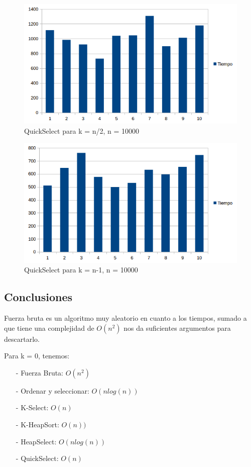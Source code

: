 \begin{figure}[H]
\centering
\includegraphics[width=\textwidth]{KN2/QuickSelectN2.png}
\caption{QuickSelect para k = n/2, n = 10000}
\end{figure}

\begin{figure}[H]
\centering
\includegraphics[width=\textwidth]{KN/QuickSelectN.png}
\caption{QuickSelect para k = n-1, n = 10000}
\end{figure}
\newpage

\subsection{Conclusiones}
Fuerza bruta es un algoritmo muy aleatorio en cuanto a los tiempos, sumado a que tiene una complejidad de $O(n^2)$ nos da suficientes argumentos para descartarlo.

Para k = 0, tenemos:
\begin{itemize}
\item[-] Fuerza Bruta: $O(n^2)$
\item[-] Ordenar y seleccionar: $O(n log(n))$
\item[-] K-Select: $O(n)$
\item[-] K-HeapSort: $O(n))$
\item[-] HeapSelect: $O(n log(n))$
\item[-] QuickSelect: $O(n)$
\end{itemize}

